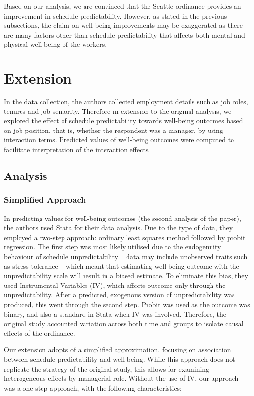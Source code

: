 \documentclass{article}
\begin{document}
	Based on our analysis, we are convinced that the Seattle ordinance provides an improvement in schedule predictability. However, as stated in the previous subsections, the claim on well-being improvements may be exaggerated as there are many factors other than schedule predictability that affects both mental and physical well-being of the workers.
	
	\section{Extension}
	
	In the data collection, the authors collected employment details such as job roles, tenures and job seniority. Therefore in extension to the original analysis, we explored the effect of schedule predictability towards well-being outcomes based on job position, that is, whether the respondent was a manager, by using interaction terms. Predicted values of well-being outcomes were computed to facilitate interpretation of the interaction effects.
	
	\subsection{Analysis}
	
	\subsubsection{Simplified Approach}
	In predicting values for well-being outcomes (the second analysis of the paper), the authors used Stata for their data analysis. Due to the type of data, they employed a two-step approach: ordinary least squares method followed by probit regression. The first step was most likely utilised due to the endogenuity behaviour of schedule unpredictability \textemdash~ data may include unobserved traits such as stress tolerance \textemdash~ which meant that estimating well-being outcome with the unpredictability scale will result in a biased estimate. To eliminate this bias, they used Instrumental Variables (IV), which affects outcome only through the unpredictability. After a predicted, exogenous version of unpredictability was produced, this went through the second step. Probit was used as the outcome was binary, and also a standard in Stata when IV was involved. Therefore, the original study accounted variation across both time and groups to isolate causal effects of the ordinance.
	
	Our extension adopts of a simplified approximation, focusing on association between schedule predictability and well-being. While this approach does not replicate the strategy of the original study, this allows for examining heterogeneous effects by managerial role.  Without the use of IV, our approach was a one-step approach, with the following characteristics:
	
\end{document}
